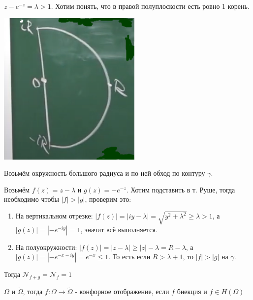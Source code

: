 \begin{example}
    $z - e^{-z} = \lambda > 1$. Хотим понять, что в правой полуплоскости есть ровно 1 корень.

    \begin{center}
        \includegraphics[width=7cm]{assets/04-functions-of-complex-variables/rushe-example.png}
    \end{center}

    Возьмём окружность большого радиуса и по ней обход по контуру $\gamma$.

    Возьмём $f(z) = z - \lambda$ и $g(z) = -e^{-z}$. Хотим подставить в т. Руше, тогда необходимо чтобы $|f| > |g|$, проверим это: 
    
    \begin{enumerate}
        \item {
            На вертикальном отрезке: $|f(z)| = |iy - \lambda| = \sqrt{y^2 + \lambda^2} \geqslant \lambda > 1$, а
            $|g(z)| = |-e^{-iy}| = 1$, значит всё выполняется.
        }
        \item {
            На полуокружности: $|f(z)| = |z - \lambda| \geqslant |z| - \lambda = R - \lambda$, а $|g(z)| = |-e^{-x - iy}| = e^{-x} \leqslant 1$. То есть если $R > \lambda + 1$, то $|f| > |g|$ на $\gamma$.
        }
    \end{enumerate}

    Тогда $\mathcal{N}_{f + g} = \mathcal{N}_f = 1$
\end{example}


\begin{definition}
    $\Omega$ и $\tilde{\Omega}$, тогда $f: \Omega \to \tilde{\Omega}$ - конфорное отображение,
    если $f$ биекция и $f \in H(\Omega)$
\end{definition}

